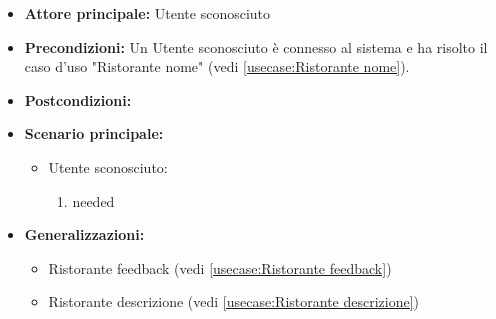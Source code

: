 \label{usecase:Ristoranti lista}
\begin{itemize}
\item \textbf{Attore principale:} Utente sconosciuto
\item \textbf{Precondizioni:}
Un Utente sconosciuto è connesso al sistema e ha risolto il caso d'uso "Ristorante nome" (vedi \autoref{usecase:Ristorante nome}).
\item \textbf{Postcondizioni:}
\item \textbf{Scenario principale:}
\begin{itemize}
\item Utente sconosciuto:
\begin{enumerate}
\item needed
\end{enumerate}
\end{itemize}
\item \textbf{Generalizzazioni:}
\begin{itemize}
\item Ristorante feedback (vedi \autoref{usecase:Ristorante feedback})\item Ristorante descrizione (vedi \autoref{usecase:Ristorante descrizione})
\end{itemize}
\end{itemize}